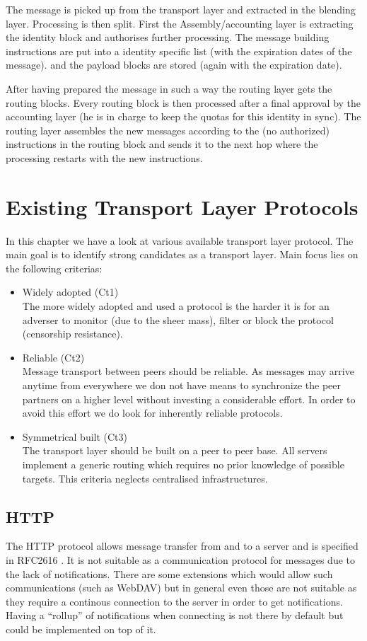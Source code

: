 The message is picked up from the transport layer and extracted in the blending layer. Processing is then split. First the Assembly/accounting layer is extracting the identity block and authorises further processing. The message building instructions are put into a identity specific list (with the expiration dates of the message). and the payload blocks are stored (again with the expiration date). 

After having prepared the message in such a way the routing layer gets the routing blocks. Every routing block is then processed after a final approval by the accounting layer (he is in charge to keep the quotas for this identity in  sync). The routing layer assembles the new messages according to the (no authorized) instructions in the routing block and sends it to the next hop where the processing restarts with the new instructions. 

\chapter{Existing Transport Layer Protocols \label{sec:existingTPP}}
In this chapter we have a look at various available transport layer protocol. The main goal is to identify strong candidates as a transport layer. Main focus lies on the following criterias:
\begin{itemize}
	\item Widely adopted (Ct1)\\
	The more widely adopted and used a protocol is the harder it is for an adverser to monitor (due to the sheer mass), filter or block the protocol (censorship resistance).
	\item Reliable (Ct2)\\
	Message transport between peers should be reliable. As messages may arrive anytime from everywhere we don not have means to synchronize the peer partners on a higher level without investing a considerable effort. In order to avoid this effort we do look for inherently reliable protocols.
	\item Symmetrical built (Ct3)\\
	The transport layer should be built on a peer to peer base. All servers implement a generic routing which requires no prior knowledge of possible targets. This criteria neglects centralised infrastructures.
\end{itemize}

\section{HTTP}
The HTTP protocol allows message transfer from and to a server and is specified in RFC2616 \cite{RFC2616}. It is not suitable as a communication protocol for messages due to the lack of notifications. There are some extensions which would allow such communications (such as WebDAV) but in general even those are not suitable as they require a continous connection to the server in order to get notifications. Having a ``rollup'' of notifications when connecting is not there by default but could be implemented on top of it. 

